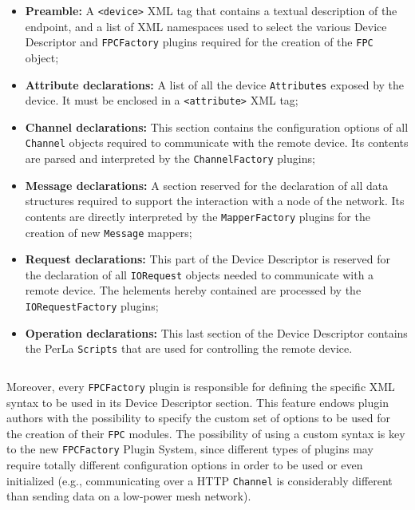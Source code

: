 \begin{itemize}

    \item \textbf{Preamble:} A \lstinline!<device>! XML tag that contains a
        textual description of the endpoint, and a list of XML namespaces used
        to select the various Device Descriptor and \texttt{FPCFactory} plugins
        required for the creation of the \texttt{FPC} object;

    \item \textbf{Attribute declarations:} A list of all the device
        \texttt{Attributes} exposed by the device. It must be enclosed in a
        \lstinline!<attribute>! XML tag;

    \item \textbf{Channel declarations:} This section contains the
        configuration options of all \texttt{Channel} objects required to
        communicate with the remote device. Its contents are parsed and
        interpreted by the \texttt{ChannelFactory} plugins;

    \item \textbf{Message declarations:} A section reserved for the declaration
        of all data structures required to support the interaction with a node
        of the network. Its contents are directly interpreted by the
        \texttt{MapperFactory} plugins for the creation of new \texttt{Message}
        mappers;

    \item \textbf{Request declarations:} This part of the Device Descriptor
        is reserved for the declaration of all \texttt{IORequest} objects
        needed to communicate with a remote device. The helements hereby
        contained are processed by the \texttt{IORequestFactory} plugins;

    \item \textbf{Operation declarations:} This last section of the Device
        Descriptor contains the PerLa \texttt{Scripts} that are used for
        controlling the remote device.

\end{itemize}

\lstset{language=XML}
\begin{lstlisting}[caption={The skeleton of the new XML Device Descriptor.}]
\end{lstlisting}

Moreover, every \texttt{FPCFactory} plugin is responsible for defining the
specific XML syntax to be used in its Device Descriptor section. This feature
endows plugin authors with the possibility to specify the custom set of options
to be used for the creation of their \texttt{FPC} modules. The possibility of
using a custom syntax is key to the new \texttt{FPCFactory} Plugin System,
since different types of plugins may require totally different configuration
options in order to be used or even initialized (e.g., communicating over a
HTTP \texttt{Channel} is considerably different than sending data on a
low-power mesh network).



